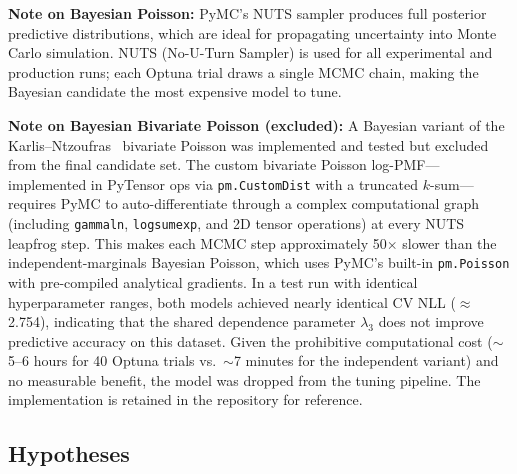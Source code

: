 \documentclass[conference]{IEEEtran}
\begin{document}
\textbf{Note on Bayesian Poisson:} PyMC's NUTS sampler produces full posterior predictive
distributions, which are ideal for propagating uncertainty into Monte Carlo simulation.
NUTS (No-U-Turn Sampler) is used for all experimental and production runs; each Optuna
trial draws a single MCMC chain, making the Bayesian candidate the most expensive
model to tune.

\textbf{Note on Bayesian Bivariate Poisson (excluded):} A Bayesian variant of the
Karlis--Ntzoufras~\cite{karlis2003analysis} bivariate Poisson was implemented and
tested but excluded from the final candidate set. The custom bivariate Poisson
log-PMF---implemented in PyTensor ops via \texttt{pm.CustomDist} with a truncated
$k$-sum---requires PyMC to auto-differentiate through a complex computational graph
(including \texttt{gammaln}, \texttt{logsumexp}, and 2D tensor operations) at every
NUTS leapfrog step. This makes each MCMC step approximately 50$\times$ slower than
the independent-marginals Bayesian Poisson, which uses PyMC's built-in
\texttt{pm.Poisson} with pre-compiled analytical gradients. In a test run with
identical hyperparameter ranges, both models achieved nearly identical CV NLL
($\approx$2.754), indicating that the shared dependence parameter $\lambda_3$ does
not improve predictive accuracy on this dataset. Given the prohibitive computational
cost ($\sim$5--6 hours for 40 Optuna trials vs.\ $\sim$7 minutes for the independent
variant) and no measurable benefit, the model was dropped from the tuning pipeline.
The implementation is retained in the repository for reference.

\subsection{Hypotheses}
\end{document}
